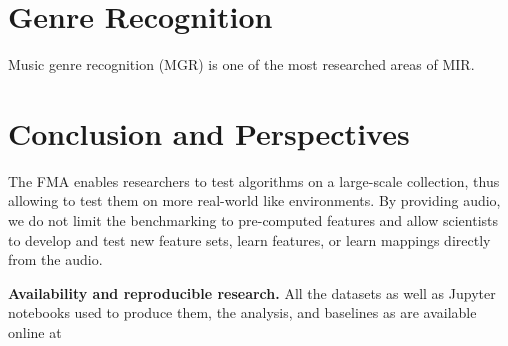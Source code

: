 \documentclass{article}
\begin{document}
\section{Genre Recognition} %

Music genre recognition (MGR) is one of the most researched areas of MIR.

%
%




\section{Conclusion and Perspectives}

The FMA enables researchers to test algorithms on a large-scale collection, thus allowing to test them on more real-world like environments. By providing audio, we do not limit the benchmarking to pre-computed features and allow scientists to develop and test new feature sets, learn features, or learn mappings directly from the audio.

{\bf Availability and reproducible research.}
All the datasets as well as Jupyter notebooks used to produce them, the
analysis, and baselines as are available online at
\end{document}
